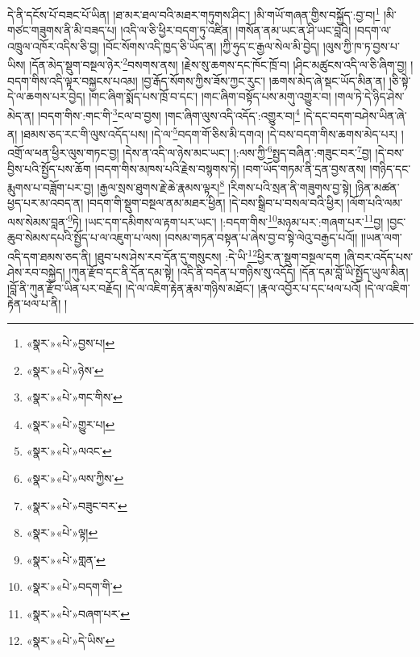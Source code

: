 དེ་ནི་དངོས་པོ་བཟང་པོ་ཡིན། །ཐ་མར་ཐལ་བའི་མཐར་གཏུགས་ཤིང་། །མི་གཡོ་གཞན་གྱིས་བསྐྱོད་:བྱ་བ།\footnote{«སྣར་»«པེ་»བྱས་པ།} །མི་གཙང་གཟུགས་ནི་མི་བཟད་པ། །འདི་ལ་ཅི་ཕྱིར་བདག་ཏུ་འཛིན། །གསོན་ནམ་ཡང་ན་ཤི་ཡང་བླའི། །བདག་ལ་འཁྲུལ་འཁོར་འདིས་ཅི་བྱ། །བོང་སོགས་འདི་ཁྱད་ཅི་ཡོད་ན། །ཀྱི་ཧུད་ང་རྒྱལ་སེལ་མི་བྱེད། །ལུས་ཀྱི་ཁ་ཏ་བྱས་པ་ཡིས། །དོན་མེད་སྡུག་བསྔལ་ཉེར་\footnote{«སྣར་»«པེ་»ཉེས་}བསགས་ནས། །རྗེས་སུ་ཆགས་དང་ཁོང་ཁྲོ་བ། །ཤིང་མཚུངས་འདི་ལ་ཅི་ཞིག་བྱ། །བདག་གིས་འདི་ལྟར་བསྐྱངས་པའམ། །བྱ་རྒོད་སོགས་ཀྱིས་ཟོས་ཀྱང་རུང་། །ཆགས་མེད་ཞེ་སྡང་ཡོད་མིན་ན། །ཅི་སྟེ་དེ་ལ་ཆགས་པར་བྱེད། །གང་ཞིག་སྨོད་པས་ཁྲོ་བ་དང་། །གང་ཞིག་བསྟོད་པས་མགུ་འགྱུར་བ། །གལ་ཏེ་དེ་ཉིད་ཤེས་མེད་ན། །བདག་གིས་:གང་གི་\footnote{«སྣར་»«པེ་»གང་གིས་}ངལ་བ་བྱས། །གང་ཞིག་ལུས་འདི་འདོད་:འགྱུར་བ།\footnote{«སྣར་»«པེ་»གྱུར་པ།} །དེ་དང་བདག་བཤེས་ཡིན་ཞེ་ན། །ཐམས་ཅད་རང་གི་ལུས་འདོད་པས། །དེ་ལ་\footnote{«སྣར་»«པེ་»ལའང་}བདག་གོ་ཅིས་མི་དགའ། །དེ་བས་བདག་གིས་ཆགས་མེད་པར། །འགྲོ་ལ་ཕན་ཕྱིར་ལུས་གཏང་བྱ། །དེས་ན་འདི་ལ་ཉེས་མང་ཡང་། །:ལས་ཀྱི་\footnote{«སྣར་»«པེ་»ལས་ཀྱིས་}སྤྱད་བཞིན་:གཟུང་བར་\footnote{«སྣར་»«པེ་»བཟུང་བར་}བྱ། །དེ་བས་བྱིས་པའི་སྤྱོད་པས་ཆོག །བདག་གིས་མཁས་པའི་རྗེས་བསྙགས་ཏེ། །བག་ཡོད་གཏམ་ནི་དྲན་བྱས་ནས། །གཉིད་དང་རྨུགས་པ་བཟློག་པར་བྱ། །རྒྱལ་སྲས་ཐུགས་རྗེ་ཆེ་རྣམས་ལྟར།\footnote{«སྣར་»«པེ་»ལྟ།} །རིགས་པའི་སྲན་ནི་གཟུགས་བྱ་སྟེ། །ཉིན་མཚན་ཕྱད་པར་མ་འབད་ན། །བདག་གི་སྡུག་བསྔལ་ནམ་མཐར་ཕྱིན། །དེ་བས་སྒྲིབ་པ་བསལ་བའི་ཕྱིར། །ལོག་པའི་ལམ་ལས་སེམས་བླན་\footnote{«སྣར་»«པེ་»གླན་}ཏེ། །ཡང་དག་དམིགས་ལ་རྟག་པར་ཡང་། །:བདག་གིས་\footnote{«སྣར་»«པེ་»བདག་གི་}མཉམ་པར་:གཞག་པར་\footnote{«སྣར་»«པེ་»བཞག་པར་}བྱ། །བྱང་ཆུབ་སེམས་དཔའི་སྤྱོད་པ་ལ་འཇུག་པ་ལས། །བསམ་གཏན་བསྟན་པ་ཞེས་བྱ་བ་སྟེ་ལེའུ་བརྒྱད་པའོ།། །།ཡན་ལག་འདི་དག་ཐམས་ཅད་ནི། །ཐུབ་པས་ཤེས་རབ་དོན་དུ་གསུངས། :དེ་ཡི་\footnote{«སྣར་»«པེ་»དེ་ཡིས་}ཕྱིར་ན་སྡུག་བསྔལ་དག །ཞི་བར་འདོད་པས་ཤེས་རབ་བསྐྱེད། །ཀུན་རྫོབ་དང་ནི་དོན་དམ་སྟེ། །འདི་ནི་བདེན་པ་གཉིས་སུ་འདོད། །དོན་དམ་བློ་ཡི་སྤྱོད་ཡུལ་མིན། །བློ་ནི་ཀུན་རྫོབ་ཡིན་པར་བརྗོད། །དེ་ལ་འཇིག་རྟེན་རྣམ་གཉིས་མཐོང་། །རྣལ་འབྱོར་པ་དང་ཕལ་པའོ། །དེ་ལ་འཇིག་རྟེན་ཕལ་པ་ནི། །
